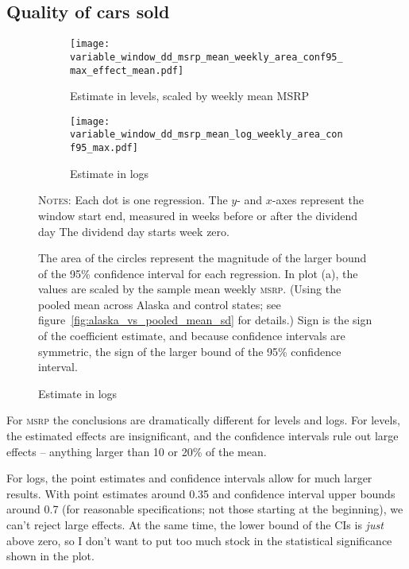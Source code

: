 \documentclass[11pt,letterpaper,oneside]{article}
\newcommand{\msrp}{\textsc{msrp}}
\begin{document}
\begin{doublespacing}
\subsection{Quality of cars sold}

\begin{figure}[hbt]
    \caption{MSRP effects with varying windows}  %
    \begin{subfigure}{\linewidth}
        \caption{Estimate in levels, scaled by weekly mean MSRP}
        \texttt{[image: variable\_window\_dd\_msrp\_mean\_weekly\_area\_conf95\_max\_effect\_mean.pdf]}
    \end{subfigure}
    \begin{subfigure}{\linewidth}
        \caption{Estimate in logs}
        \texttt{[image: variable\_window\_dd\_msrp\_mean\_log\_weekly\_area\_conf95\_max.pdf]}
    \end{subfigure}


    {\footnotesize
    \textsc{Notes:}
    Each dot is one regression.
    The $y$- and $x$-axes represent the window start end, measured in weeks before or after the dividend day
    The dividend day starts week zero.

     The area of the circles represent the magnitude of the larger bound of the 95\% confidence interval for each regression.
    In plot (a), the values are scaled by the sample mean weekly \msrp{}.
    (Using the pooled mean across Alaska and control states; see figure~\ref{fig:alaska_vs_pooled_mean_sd} for details.)
    Sign is the sign of the coefficient estimate, and because confidence intervals are symmetric, the sign of the larger bound of the 95\% confidence interval.
    }
\end{figure}


For \msrp{} the conclusions are dramatically different for levels and logs.
    For levels, the estimated effects are insignificant, and the confidence intervals rule out large effects -- anything larger than 10 or 20\% of the mean.

    For logs, the point estimates and confidence intervals allow for much larger results.
    With point estimates around 0.35 and confidence interval upper bounds around 0.7 (for reasonable specifications; not those starting at the beginning), we can't reject large effects.
    At the same time, the lower bound of the CIs is \emph{just} above zero, so I don't want to put too much stock in the statistical significance shown in the plot.


\end{doublespacing}
\end{document}
